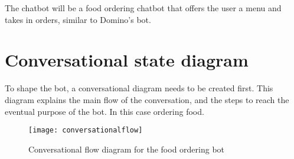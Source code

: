 The chatbot will be a food ordering chatbot that offers the user a menu and takes in orders, similar to Domino's bot.

\section{Conversational state diagram}

To shape the bot, a conversational diagram needs to be created first. This diagram explains the main flow of the conversation, and the steps to reach the eventual purpose of the bot. In this case ordering food.

\begin{figure}[p]
	\centering
	\texttt{[image: conversationalflow]}\label{fig:conversationalflow}
	\caption{Conversational flow diagram for the food ordering bot~}
\end{figure}

